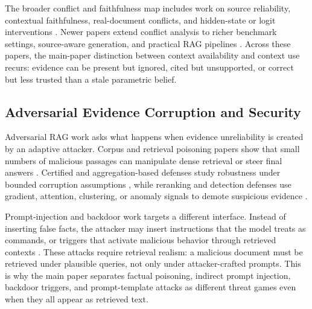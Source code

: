 The broader conflict and faithfulness map includes work on source reliability, contextual faithfulness, real-document conflicts, and hidden-state or logit interventions \citep{rrag118,rrag130,rrag147,rrag150,rrag152,rrag163,rrag176,rrag187}. Newer papers extend conflict analysis to richer benchmark settings, source-aware generation, and practical RAG pipelines \citep{rrag202,rrag204,rrag207,rrag209,rrag214,rrag216,rrag220,rrag222,rrag223,rrag227}. Across these papers, the main-paper distinction between context availability and context use recurs: evidence can be present but ignored, cited but unsupported, or correct but less trusted than a stale parametric belief.

\subsection{Adversarial Evidence Corruption and Security}

Adversarial RAG work asks what happens when evidence unreliability is created by an adaptive attacker. Corpus and retrieval poisoning papers show that small numbers of malicious passages can manipulate dense retrieval or steer final answers \citep{poisoningRetrievalCorpora2023,poisonedRAG2024,badRAG2024,rrag049,rrag057}. Certified and aggregation-based defenses study robustness under bounded corruption assumptions \citep{certifiedRAG2024,rrag016,rrag020}, while reranking and detection defenses use gradient, attention, clustering, or anomaly signals to demote suspicious evidence \citep{rrag004,rrag009,rrag011,rrag015,rrag017}.

Prompt-injection and backdoor work targets a different interface. Instead of inserting false facts, the attacker may insert instructions that the model treats as commands, or triggers that activate malicious behavior through retrieved contexts \citep{aip2025,rrag005,trojanRAG2024,phantom2024,rrag010,rrag018}. These attacks require retrieval realism: a malicious document must be retrieved under plausible queries, not only under attacker-crafted prompts. This is why the main paper separates factual poisoning, indirect prompt injection, backdoor triggers, and prompt-template attacks as different threat games even when they all appear as retrieved text.

